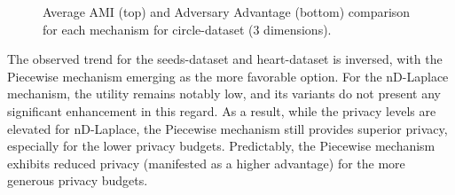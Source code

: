 \begin{figure}[H]
\begin{subfigure}{1\textwidth}
  \end{subfigure}
  \caption{Average AMI (top) and Adversary Advantage (bottom) comparison for each mechanism for circle-dataset (3 dimensions).}
  \label{fig:utility_circle-dataset_comparison_nd_plot}
\end{figure}

The observed trend for the seeds-dataset and heart-dataset is inversed, with the Piecewise mechanism emerging as the more favorable option. For the nD-Laplace mechanism, the utility remains notably low, and its variants do not present any significant enhancement in this regard. As a result, while the privacy levels are elevated for nD-Laplace, the Piecewise mechanism still provides superior privacy, especially for the lower privacy budgets. Predictably, the Piecewise mechanism exhibits reduced privacy (manifested as a higher advantage) for the more generous privacy budgets.
\newpage

